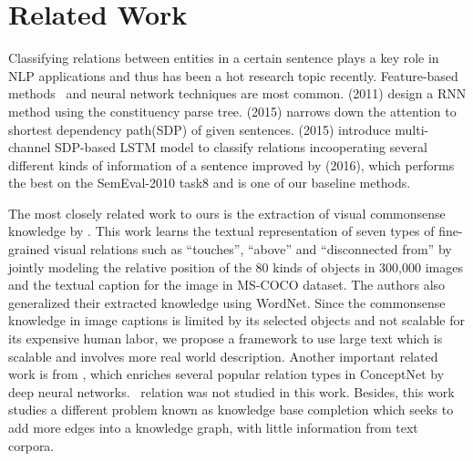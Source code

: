\section{Related Work}
Classifying relations between entities in a certain sentence plays a key role in NLP applications and thus has been a hot research topic recently.
Feature-based methods~\cite{sem} and neural network techniques are most common. 
\citeauthor{socher2011semi}(2011) design a RNN method using the constituency parse tree. \citeauthor{ebrahimi2015chain} (2015) narrows down the attention to shortest dependency path(SDP) of given sentences. 
\citeauthor{xu2015classifying}(2015) introduce multi-channel  SDP-based LSTM model to classify relations incooperating several different kinds of information of a sentence improved by \citeauthor{xu2016improved}(2016), which performs the best on the SemEval-2010 task8 and is one of our baseline methods.

The most closely related work to ours is the extraction of
visual commonsense knowledge by \citeauthor{yatskar2016stating}. 
This work learns the textual representation of seven types of fine-grained 
visual relations such as ``touches'', ``above'' and ``disconnected from'' 
by jointly modeling the relative position of the 80 kinds of objects in 300,000 images
and the textual caption for the image in MS-COCO dataset\cite{lin2014microsoft}. 
The authors also generalized their extracted knowledge using WordNet. 
Since the commonsense knowledge in image captions is limited by its selected objects and not scalable for its expensive human labor, we propose a framework to use large text which is scalable and involves more real world description. 
Another important related work is from \citeauthor{li2016commonsense}, which enriches
several popular relation types in ConceptNet by deep neural networks.
\lnear~relation was not studied in this work. Besides, this work studies
a different problem known as knowledge base completion which seeks to
add more edges into a knowledge graph, with little information from
text corpora. 
